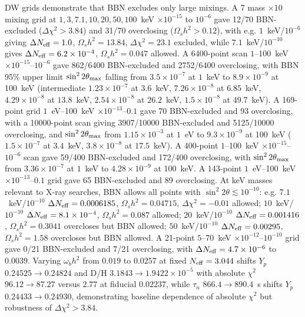 \documentclass[11pt,a4paper]{article}
\begin{document}
DW grids demonstrate that BBN excludes only large mixings. A 7 mass $\times10$ mixing grid at $1,3,7.1,10,20,50,100$~keV $\times10^{-15}$ to $10^{-6}$ gave 12/70 BBN-excluded ($\Delta\chi^{2}>3.84$) and 31/70 overclosing ($\Omega_{s}h^{2}>0.12$), with e.g. $1$~keV/$10^{-6}$ giving $\Delta N_{\rm eff}=1.0$, $\Omega_{s}h^{2}=13.84$, $\Delta\chi^{2}=23.1$ excluded, while $7.1$~keV/$10^{-10}$ gives $\Delta N_{\rm eff}=6.2\times10^{-4}$, $\Omega_{s}h^{2}=0.047$ allowed. A 6400-point scan $1$--100~keV $\times10^{-15}$--$10^{-6}$ gave 862/6400 BBN-excluded and 2752/6400 overclosing, with BBN 95\% upper limit $\sin^{2}2\theta_{\rm max}$ falling from $3.5\times10^{-7}$ at $1$~keV to $8.9\times10^{-9}$ at 100~keV (intermediate $1.23\times10^{-7}$ at $3.6$~keV, $7.26\times10^{-8}$ at $6.85$~keV, $4.29\times10^{-8}$ at $13.8$~keV, $2.54\times10^{-8}$ at $26.2$~keV, $1.5\times10^{-8}$ at $49.7$~keV). A 169-point grid $1$~eV--100~keV $\times10^{-13}$--$0.1$ gave 70 BBN-excluded and 93 overclosing, with a 10000-point scan giving 3907/10000 BBN-excluded and 5125/10000 overclosing, and $\sin^{2}2\theta_{\rm max}$ from $1.15\times10^{-3}$ at $1$~eV to $9.3\times10^{-9}$ at 100~keV ($1.5\times10^{-7}$ at $3.4$~keV, $3.8\times10^{-8}$ at $17.5$~keV). A 400-point $1$--100~keV $\times10^{-15}$--$10^{-6}$ scan gave 59/400 BBN-excluded and 172/400 overclosing, with $\sin^{2}2\theta_{\rm max}$ from $3.36\times10^{-7}$ at $1$~keV to $4.28\times10^{-9}$ at 100~keV. A 143-point $1$~eV--100~keV $\times10^{-13}$--$0.1$ grid gave 65 BBN-excluded and 89 overclosing. At keV masses relevant to X-ray searches, BBN allows all points with $\sin^{2}2\theta\lesssim10^{-10}$: e.g. $7.1$~keV/$10^{-10}$ $\Delta N_{\rm eff}=0.0006185$, $\Omega_{s}h^{2}=0.04715$, $\Delta\chi^{2}=-0.01$ allowed; $10$~keV/$10^{-10}$ $\Delta N_{\rm eff}=8.1\times10^{-4}$, $\Omega_{s}h^{2}=0.087$ allowed; $20$~keV/$10^{-10}$ $\Delta N_{\rm eff}=0.001416$, $\Omega_{s}h^{2}=0.3041$ overcloses but BBN allowed; $50$~keV/$10^{-10}$ $\Delta N_{\rm eff}=0.00295$, $\Omega_{s}h^{2}=1.58$ overcloses but BBN allowed. A 21-point $5$--70~keV $\times10^{-12}$--$10^{-10}$ grid gave 0/21 BBN-excluded and 7/21 overclosing, with $\Delta N_{\rm eff}=4.7\times10^{-6}$ to $0.0039$. Varying $\omega_{b}h^{2}$ from $0.019$ to $0.0257$ at fixed $N_{\rm eff}=3.044$ shifts $Y_{p}$ $0.24525\to0.24824$ and D/H $3.1843\to1.9422\times10^{-5}$ with absolute $\chi^{2}$ $96.12\to87.27$ versus $2.77$ at fiducial $0.02237$, while $\tau_{n}$ $866.4\to890.4$~s shifts $Y_{p}$ $0.24433\to0.24930$, demonstrating baseline dependence of absolute $\chi^{2}$ but robustness of $\Delta\chi^{2}>3.84$.
\end{document}

